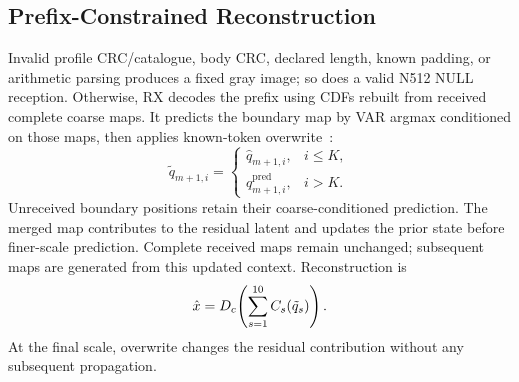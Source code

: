 \subsection{Prefix-Constrained Reconstruction}
Invalid profile CRC/catalogue, body CRC, declared length, known padding, or arithmetic parsing produces a fixed gray image; so does a valid N512 NULL reception. Otherwise, RX decodes the prefix using CDFs rebuilt from received complete coarse maps. It predicts the boundary map by VAR argmax conditioned on those maps, then applies known-token overwrite~\cite{var}:
\begin{equation}
 \tilde q_{m+1,i}=\begin{cases}\hat q_{m+1,i},&i\leq K,\\q^{\mathrm{pred}}_{m+1,i},&i>K.\end{cases}
 \label{eq:overwrite}
\end{equation}
Unreceived boundary positions retain their coarse-conditioned prediction. The merged map contributes to the residual latent and updates the prior state before finer-scale prediction. Complete received maps remain unchanged; subsequent maps are generated from this updated context. Reconstruction is
\begin{equation}
 \hat x=D_c\!\left(\sum_{s=1}^{10}C_s(\tilde q_s)\right).
 \label{eq:reconstruction}
\end{equation}
At the final scale, overwrite changes the residual contribution without any subsequent propagation.
